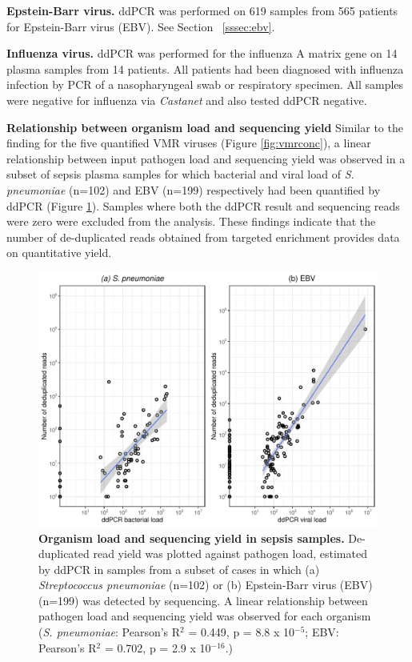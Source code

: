 \textbf{Epstein-Barr virus.} ddPCR was performed on 619 samples from 565 patients for Epstein-Barr virus (EBV). See Section ~\ref{sssec:ebv}.

\textbf{Influenza virus.} ddPCR was performed for the influenza A matrix gene on 14 plasma samples from 14 patients. All patients had been diagnosed with influenza infection by PCR of a nasopharyngeal swab or respiratory specimen. All samples were negative for influenza via \textit{Castanet} and also tested ddPCR negative. 

\textbf{Relationship between organism load and sequencing yield} Similar to the finding for the five quantified VMR viruses (Figure \ref{fig:vmrconc}), a linear relationship between input pathogen load and sequencing yield was observed in a subset of sepsis plasma samples for which bacterial and viral load of \textit{S. pneumoniae} (n=102) and EBV (n=199) respectively had been quantified by ddPCR (Figure \ref{fig:ddPCR}). Samples where both the ddPCR result and sequencing reads were zero were excluded from the analysis. These findings indicate that the number of de-duplicated reads obtained from targeted enrichment provides data on quantitative yield.

\FloatBarrier
\begin{figure}[htbp]
\centering
\includegraphics[scale=0.6]{./Results2/Images/ddPCR.pdf}
\caption[Organism load and sequencing yield in sepsis samples]{\textbf{Organism load and sequencing yield in sepsis samples.} De-duplicated read yield was plotted against pathogen load, estimated by ddPCR in samples from a subset of cases in which (a) \textit{Streptococcus pneumoniae} (n=102) or (b) Epstein-Barr virus (EBV) (n=199) was detected by sequencing. A linear relationship between pathogen load and sequencing yield was observed for each organism (\textit{S. pneumoniae}: Pearson's R$^2$ = 0.449, p = 8.8 x 10$^{-5}$; EBV: Pearson's R$^2$ = 0.702, p = 2.9 x 10$^{-16}$.)}
\label{fig:ddPCR}
\end{figure}

